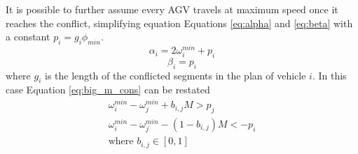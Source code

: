It is possible to further assume every AGV travels at maximum speed once it reaches the conflict, simplifying equation Equations \ref{eq:alpha} and \ref{eq:beta} with a constant $p_i = g_i \phi_{min}$. 
\begin{equation}
\alpha_i = 2\omega_i^{min} + p_i
\end{equation}
\begin{equation}
\beta_i = p_i
\end{equation}
 where $g_i$ is the length of the conflicted segments in the plan of vehicle $i$. In this case Equation \ref{eq:big_m_cons} can be restated 
\begin{equation}
\begin{array}{cc}
\omega_i^{min} - \omega_j^{min} + b_{i,j}M > p_j \\
\omega_i^{min} - \omega_j^{min}  - (1-b_{i,j})M < -p_i \\
\textrm{where } b_{i,j}\in[0,1] \\
\end{array}
\label{eq:minlp}
\end{equation}